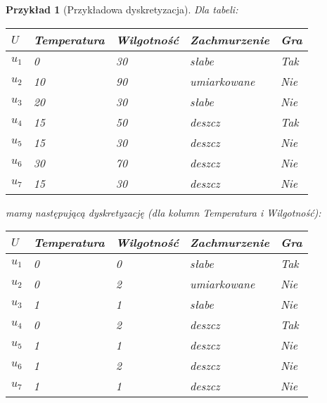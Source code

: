 \documentclass[magisterska]{pracamgr}
\theoremstyle{plain}
\newtheorem{przyklad}[thm]{Przykład}
\theoremstyle{definition}
\theoremstyle{remark}
\begin{document}
\begin{przyklad}[Przykładowa dyskretyzacja]
Dla tabeli:
\begin{center}
 \begin{tabular}{l || P{2.5cm} P{2.5cm} P{2.5cm} | P{1.5cm}}
  $U$     & Temperatura & Wilgotność & Zachmurzenie & Gra \\ 
  \hline
  $u_{1}$ & 0      & 30      & słabe          & Tak \\
  $u_{2}$ & 10     & 90      & umiarkowane    & Nie \\
  $u_{3}$ & 20     & 30      & słabe   	      & Nie \\
  $u_{4}$ & 15     & 50      & deszcz         & Tak \\
  $u_{5}$ & 15     & 30      & deszcz         & Nie \\
  $u_{6}$ & 30     & 70      & deszcz         & Nie \\
  $u_{7}$ & 15     & 30      & deszcz         & Nie \\
 \end{tabular}
\end{center}
mamy następującą dyskretyzację (dla kolumn Temperatura i Wilgotność):
\begin{center}
 \begin{tabular}{l || P{2.5cm} P{2.5cm} P{2.5cm} | P{1.5cm}}
  $U$     & Temperatura & Wilgotność & Zachmurzenie & Gra \\ 
  \hline
  $u_{1}$ & 0     & 0      & słabe          & Tak \\
  $u_{2}$ & 0     & 2      & umiarkowane    & Nie \\
  $u_{3}$ & 1     & 1      & słabe   	    & Nie \\
  $u_{4}$ & 0     & 2      & deszcz         & Tak \\
  $u_{5}$ & 1     & 1      & deszcz         & Nie \\
  $u_{6}$ & 1     & 2      & deszcz         & Nie \\
  $u_{7}$ & 1     & 1      & deszcz         & Nie \\
 \end{tabular}
\end{center}
\end{przyklad}
\end{document}
